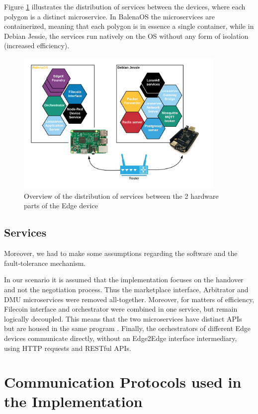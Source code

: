 Figure \ref{fig:dist_arch} illustrates the distribution of services between the devices, where each polygon is a distinct microservice. In BalenaOS the microservices are containerized, meaning that each polygon is in essence a single container, while in Debian Jessie, the services run natively on the OS without any form of isolation (increased efficiency).

\begin{figure}[h]
    \centering
    \includegraphics[width=0.9\textwidth]{images/dist_arch_hardware.png}
    \caption{Overview of the distribution of services between the 2 hardware parts of the Edge device}
    \label{fig:dist_arch}
\end{figure}

\subsection{Services}

Moreover, we had to make some assumptions regarding the software and the fault-tolerance mechanism. 

In our scenario it is assumed that the implementation focuses on the handover and not the negotiation process. Thus the marketplace interface, Arbitrator and DMU microservices were removed all-together. Moreover, for matters of efficiency, Filecoin interface and orchestrator were combined in one service, but remain logically decoupled. This means that the two microservices have distinct APIs but are housed in the same program . Finally, the orchestrators of different Edge devices communicate directly, without an Edge2Edge interface intermediary, using HTTP requests and RESTful APIs.

\section{Communication Protocols used in the Implementation}

